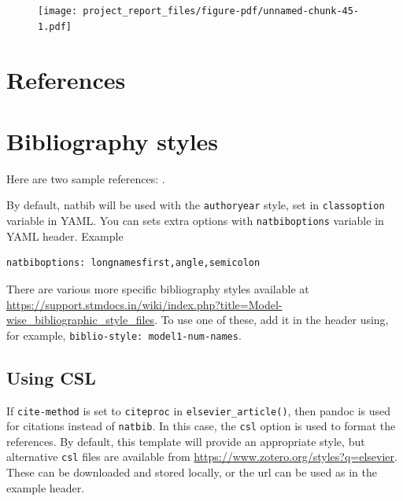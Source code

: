 \documentclass[
  super,
  preprint,
  3p]{elsarticle}
\begin{document}
\begin{figure}[H]

{\centering \texttt{[image: project\_report\_files/figure-pdf/unnamed-chunk-45-1.pdf]}

}

\end{figure}

\hypertarget{references}{%
\section*{References}\label{references}}

\hypertarget{bibliography-styles}{%
\section{Bibliography styles}\label{bibliography-styles}}

Here are two sample references: \citet{Feynman1963118}
\citet{Dirac1953888}.

By default, natbib will be used with the \texttt{authoryear} style, set
in \texttt{classoption} variable in YAML. You can sets extra options
with \texttt{natbiboptions} variable in YAML header. Example

\begin{verbatim}
natbiboptions: longnamesfirst,angle,semicolon
\end{verbatim}

There are various more specific bibliography styles available at
\url{https://support.stmdocs.in/wiki/index.php?title=Model-wise_bibliographic_style_files}.
To use one of these, add it in the header using, for example,
\texttt{biblio-style:\ model1-num-names}.

\hypertarget{using-csl}{%
\subsection{Using CSL}\label{using-csl}}

If \texttt{cite-method} is set to \texttt{citeproc} in
\texttt{elsevier\_article()}, then pandoc is used for citations instead
of \texttt{natbib}. In this case, the \texttt{csl} option is used to
format the references. By default, this template will provide an
appropriate style, but alternative \texttt{csl} files are available from
\url{https://www.zotero.org/styles?q=elsevier}. These can be downloaded
and stored locally, or the url can be used as in the example header.


  
\end{document}
